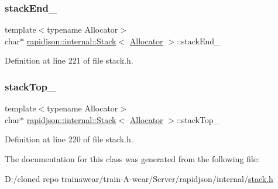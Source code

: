 \subsubsection{\texorpdfstring{stackEnd\_}{stackEnd\_}}
{\footnotesize\ttfamily template$<$typename Allocator$>$ \\
char$\ast$ \mbox{\hyperlink{classrapidjson_1_1internal_1_1_stack}{rapidjson\+::internal\+::\+Stack}}$<$ \mbox{\hyperlink{classrapidjson_1_1_allocator}{Allocator}} $>$\+::stack\+End\+\_\+\hspace{0.3cm}{\ttfamily [private]}}



Definition at line 221 of file stack.\+h.

\mbox{\label{classrapidjson_1_1internal_1_1_stack_a954daadd0fa6ea68e84d7491311874da}} 
\subsubsection{\texorpdfstring{stackTop\_}{stackTop\_}}
{\footnotesize\ttfamily template$<$typename Allocator$>$ \\
char$\ast$ \mbox{\hyperlink{classrapidjson_1_1internal_1_1_stack}{rapidjson\+::internal\+::\+Stack}}$<$ \mbox{\hyperlink{classrapidjson_1_1_allocator}{Allocator}} $>$\+::stack\+Top\+\_\+\hspace{0.3cm}{\ttfamily [private]}}



Definition at line 220 of file stack.\+h.



The documentation for this class was generated from the following file\+:\begin{DoxyCompactItemize}
\item 
D\+:/cloned repo trainawear/train-\/\+A-\/wear/\+Server/rapidjson/internal/\mbox{\hyperlink{stack_8h}{stack.\+h}}\end{DoxyCompactItemize}
